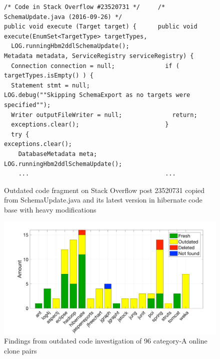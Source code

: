 \documentclass{sig-alternate-05-2015}
\begin{document}
\begin{figure}
	\begin{lstlisting}
/* Code in Stack Overflow #23520731 */     /* SchemaUpdate.java (2016-09-26) */
public void execute (Target target) {      public void execute(EnumSet<TargetType> targetTypes, 
  LOG.runningHbm2ddlSchemaUpdate();                        Metadata metadata, ServiceRegistry serviceRegistry) {
  Connection connection = null;              if ( targetTypes.isEmpty() ) {
  Statement stmt = null;                       LOG.debug(""Skipping SchemaExport as no targets were specified"");
  Writer outputFileWriter = null;              return;
  exceptions.clear();                        }
  try {                                      exceptions.clear();
    DatabaseMetadata meta;                   LOG.runningHbm2ddlSchemaUpdate();
    ...                                      ...
	\end{lstlisting}
	\caption{Outdated code fragment on Stack Overflow post 23520731 copied from SchemaUpdate.java and its latest version in hibernate code base with heavy modifications}
	\label{fig:hibernate_outdated_code}
\end{figure}

\begin{figure}
	\centering
	\includegraphics[width=\linewidth]{outdated}
	\caption{Findings from outdated code investigation of 96 category-A online clone pairs}
	\label{fig:outdated}
\end{figure}
\end{document}
